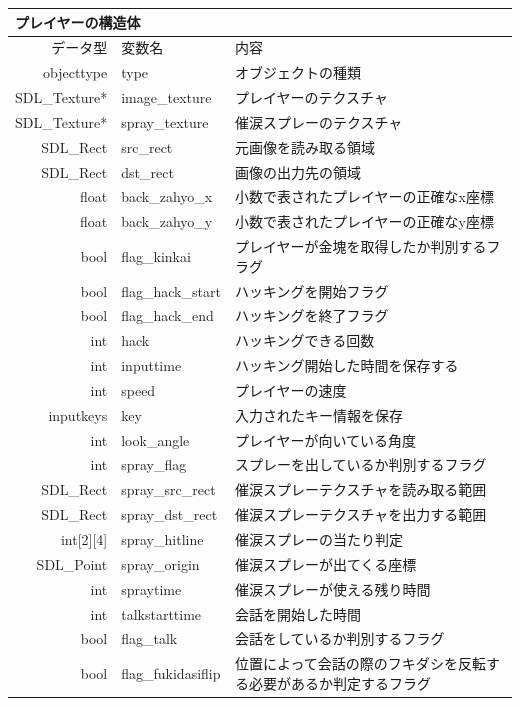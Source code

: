 \documentclass{jarticle}
\begin{document}
\begin{table}[H]
\begin{tabular}{|r|l|p{25em}|}
\hline
\multicolumn{3}{|l|}{プレイヤーの構造体}       \\ \hline
データ型      & 変数名    & 内容        \\ \hline
objecttype    & type & オブジェクトの種類  \\
SDL\_Texture* & image\_texture     & プレイヤーのテクスチャ \\
SDL\_Texture* & spray\_texture     & 催涙スプレーのテクスチャ \\
SDL\_Rect & src\_rect & 元画像を読み取る領域 \\
SDL\_Rect & dst\_rect & 画像の出力先の領域 \\
float & back\_zahyo\_x & 小数で表されたプレイヤーの正確なx座標\\
float & back\_zahyo\_y & 小数で表されたプレイヤーの正確なy座標\\
bool & flag\_kinkai & プレイヤーが金塊を取得したか判別するフラグ\\
bool & flag\_hack\_start & ハッキングを開始フラグ\\
bool & flag\_hack\_end & ハッキングを終了フラグ\\
int &hack & ハッキングできる回数\\
int & inputtime & ハッキング開始した時間を保存する\\
int & speed & プレイヤーの速度\\
inputkeys &key & 入力されたキー情報を保存\\
int & look\_angle & プレイヤーが向いている角度\\
int & spray\_flag & スプレーを出しているか判別するフラグ\\
SDL\_Rect & spray\_src\_rect & 催涙スプレーテクスチャを読み取る範囲\\
SDL\_Rect & spray\_dst\_rect & 催涙スプレーテクスチャを出力する範囲\\
int[2][4] & spray\_hitline & 催涙スプレーの当たり判定\\
SDL\_Point &spray\_origin &  催涙スプレーが出てくる座標 \\
int & spraytime & 催涙スプレーが使える残り時間\\
int & talkstarttime & 会話を開始した時間\\
bool & flag\_talk & 会話をしているか判別するフラグ \\
bool & flag\_fukidasiflip & 位置によって会話の際のフキダシを反転する必要があるか判定するフラグ\\ \hline
\end{tabular}
\end{table}
\end{document}
